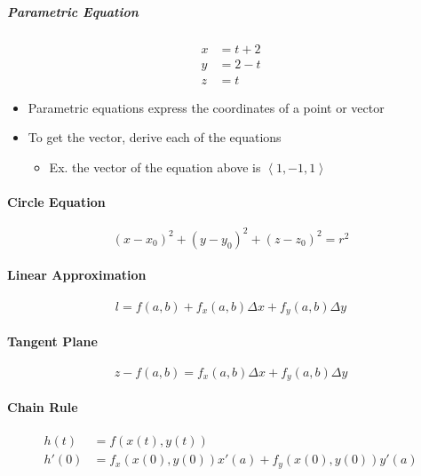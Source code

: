 \documentclass[11pt]{article}
\begin{document}
    \subparagraph{Parametric Equation}

    \begin{align*}
      x &= t + 2 \\
      y &= 2 - t \\
      z &= t
    \end{align*}

    \begin{itemize}
      \item Parametric equations express the coordinates of a point or vector
      \item To get the vector, derive each of the equations
      \begin{itemize}
        \item Ex. the vector of the equation above is $ \left< 1, -1, 1 \right> $
      \end{itemize}
    \end{itemize}

  \paragraph{Circle Equation}
  \begin{equation}
    \left( x - x_{0} \right)^{2}
      + \left( y - y_{0} \right)^{2}
      + \left( z - z_{0} \right)^{2}
      = r^{2}
  \end{equation}

  \paragraph{Linear Approximation}
  \begin{equation}
    l = f\left( a, b \right)
      + f_{x} \left( a, b \right) \Delta x
      + f_{y} \left( a, b \right) \Delta y
  \end{equation}

  \paragraph{Tangent Plane}
  \begin{equation}
    z - f\left( a, b \right)
      = f_{x} \left( a, b \right) \Delta x
      + f_{y} \left( a, b \right) \Delta y
  \end{equation}

  \paragraph{Chain Rule}
  \begin{align}
    h(t) &= f(x(t), y(t)) \\
    h'(0) &= f_{x}(x(0), y(0)) x'(a) + f_{y}(x(0), y(0)) y'(a)
  \end{align}
\end{document}
